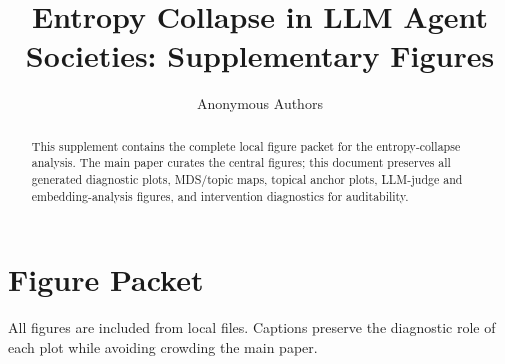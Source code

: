 \documentclass[11pt]{article}
\title{Entropy Collapse in LLM Agent Societies: Supplementary Figures}
\author{Anonymous Authors}
\begin{document}
\maketitle

\begin{abstract}
This supplement contains the complete local figure packet for the entropy-collapse analysis. The main paper curates the central figures; this document preserves all generated diagnostic plots, MDS/topic maps, topical anchor plots, LLM-judge and embedding-analysis figures, and intervention diagnostics for auditability.
\end{abstract}

\section{Figure Packet}

All figures are included from local files. Captions preserve the diagnostic role of each plot while avoiding crowding the main paper.



\end{document}
